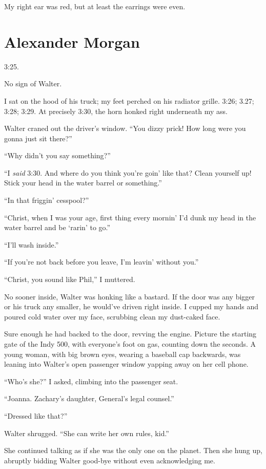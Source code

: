 My right ear was red, but at least the earrings were even.

\chapter{Alexander Morgan}

\titlemark

3:25.

No sign of Walter.

I sat on the hood of his truck; my feet perched on his radiator grille.
3:26; 3.27; 3:28; 3:29. At precisely 3:30, the horn honked right
underneath my ass.

Walter craned out the driver's window. ``You dizzy prick! How long were
you gonna just sit there?''

``Why didn't you say something?''

``I \emph{said} 3:30. And where do you think you're goin' like that?
Clean yourself up! Stick your head in the water barrel or something.''

``In that friggin' cesspool?''

``Christ, when I was your age, first thing every mornin' I'd dunk my
head in the water barrel and be `rarin' to go.''

``I'll wash inside.''

``If you're not back before you leave, I'm leavin' without you.''

``Christ, you sound like Phil,'' I muttered.

No sooner inside, Walter was honking like a bastard. If the door was any
bigger or his truck any smaller, he would've driven right inside. I
cupped my hands and poured cold water over my face, scrubbing clean my
dust-caked face.

Sure enough he had backed to the door, revving the engine. Picture the
starting gate of the Indy 500, with everyone's foot on gas, counting
down the seconds. A young woman, with big brown eyes, wearing a baseball
cap backwards, was leaning into Walter's open passenger window yapping
away on her cell phone.

``Who's she?'' I asked, climbing into the passenger seat.

``Joanna. Zachary's daughter, General's legal counsel.''

``Dressed like that?''

Walter shrugged. ``She can write her own rules, kid.''

She continued talking as if she was the only one on the planet. Then she
hung up, abruptly bidding Walter good-bye without even acknowledging me.

